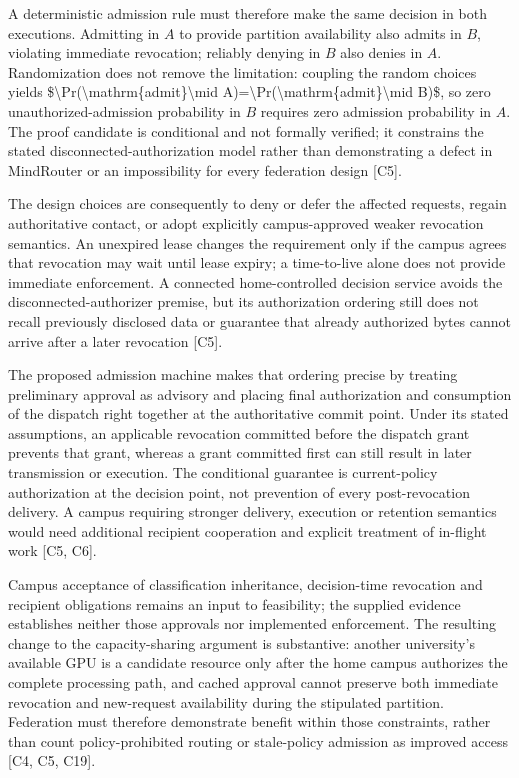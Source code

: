 \documentclass[11pt]{article}
\begin{document}
A deterministic admission rule must therefore make the same decision in both executions. Admitting in $A$ to provide partition availability also admits in $B$, violating immediate revocation; reliably denying in $B$ also denies in $A$. Randomization does not remove the limitation: coupling the random choices yields \$\textbackslash{}Pr(\textbackslash{}mathrm\{admit\}\textbackslash{}mid A)=\textbackslash{}Pr(\textbackslash{}mathrm\{admit\}\textbackslash{}mid B)\$, so zero unauthorized-admission probability in $B$ requires zero admission probability in $A$. The proof candidate is conditional and not formally verified; it constrains the stated disconnected-authorization model rather than demonstrating a defect in MindRouter or an impossibility for every federation design [C5].

The design choices are consequently to deny or defer the affected requests, regain authoritative contact, or adopt explicitly campus-approved weaker revocation semantics. An unexpired lease changes the requirement only if the campus agrees that revocation may wait until lease expiry; a time-to-live alone does not provide immediate enforcement. A connected home-controlled decision service avoids the disconnected-authorizer premise, but its authorization ordering still does not recall previously disclosed data or guarantee that already authorized bytes cannot arrive after a later revocation [C5].

The proposed admission machine makes that ordering precise by treating preliminary approval as advisory and placing final authorization and consumption of the dispatch right together at the authoritative commit point. Under its stated assumptions, an applicable revocation committed before the dispatch grant prevents that grant, whereas a grant committed first can still result in later transmission or execution. The conditional guarantee is current-policy authorization at the decision point, not prevention of every post-revocation delivery. A campus requiring stronger delivery, execution or retention semantics would need additional recipient cooperation and explicit treatment of in-flight work [C5, C6].

Campus acceptance of classification inheritance, decision-time revocation and recipient obligations remains an input to feasibility; the supplied evidence establishes neither those approvals nor implemented enforcement. The resulting change to the capacity-sharing argument is substantive: another university\textquoteright{}s available GPU is a candidate resource only after the home campus authorizes the complete processing path, and cached approval cannot preserve both immediate revocation and new-request availability during the stipulated partition. Federation must therefore demonstrate benefit within those constraints, rather than count policy-prohibited routing or stale-policy admission as improved access [C4, C5, C19].
\end{document}
